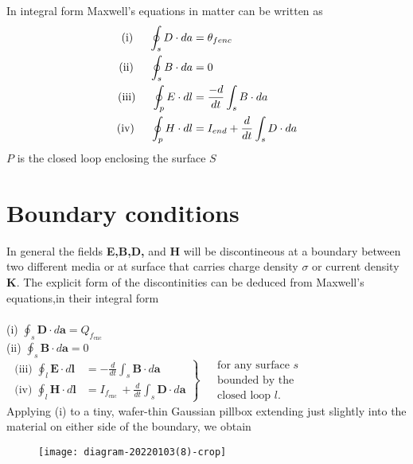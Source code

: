 In integral form Maxwell's equations in matter can be written as\\
\begin{align*}
\text{(i)}\hspace{0.5cm}\oint_{s}D\cdot da&=\theta_{fenc}\\
\text{(ii)}\hspace{0.5cm}\oint_{s}B\cdot da&=0\\
\text{(iii)}\hspace{0.5cm}\oint_{p}E\cdot dl&=\frac{-d}{dt}\int_{s} B\cdot da\\
\text{(iv)}\hspace{0.5cm}\oint_{p}H\cdot dl&=I_{end}+\frac{d}{dt}\int_{s} D\cdot da\\
\end{align*}
$P$ is the closed loop enclosing the surface $S$
\section{Boundary conditions}
In general the fields \textbf{E,B,D,} and \textbf{H} will be discontineous at a boundary between two different media or at surface that carries charge density $\sigma$ or current density \textbf{K}. The explicit form of the discontinities can be deduced from Maxwell's equations,in their integral form\\\\
(i) $\oint_s \mathbf{D} \cdot d \mathbf{a}=Q_{f_{\mathrm{enc}}}$\\
(ii) $\oint_s \mathbf{B} \cdot d \mathbf{a}=0$\\
$\left.\begin{array}{l|l}\text { (iii) } \oint_l \mathbf{E} \cdot d \mathbf{l} & =-\frac{d}{d t} \int_s \mathbf{B} \cdot d \mathbf{a} \\ 
\text { (iv) } \oint_l \mathbf{H} \cdot d \mathbf{l} & =I_{f_{\text {enc }}}+\frac{d}{d t} \int_s \mathbf{D} \cdot d \mathbf{a}\end{array}\right\} \begin{aligned}&\text { for any surface } s \\&\text { bounded by the } \\&\text { closed loop } l .\end{aligned}$\\
Applying (i) to a tiny, wafer-thin Gaussian pillbox extending just slightly into the material on either side of the boundary, we obtain \\
\begin{figure}[H]
	\centering
	\texttt{[image: diagram-20220103(8)-crop]}
	\caption{}
	\label{}
\end{figure}

